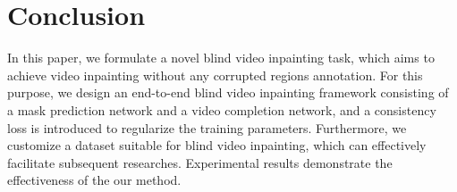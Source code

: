 \section{Conclusion}
\label{Conclusion}
In this paper, we formulate a novel blind video inpainting task,
which aims to achieve video inpainting without any corrupted regions annotation.
For this purpose, we design an end-to-end blind video inpainting framework consisting of a mask prediction network and a video completion network, and a consistency loss is introduced to regularize the training parameters.
Furthermore, we customize a dataset suitable for blind video inpainting, which can effectively facilitate subsequent researches.
Experimental results demonstrate the effectiveness of the our method.